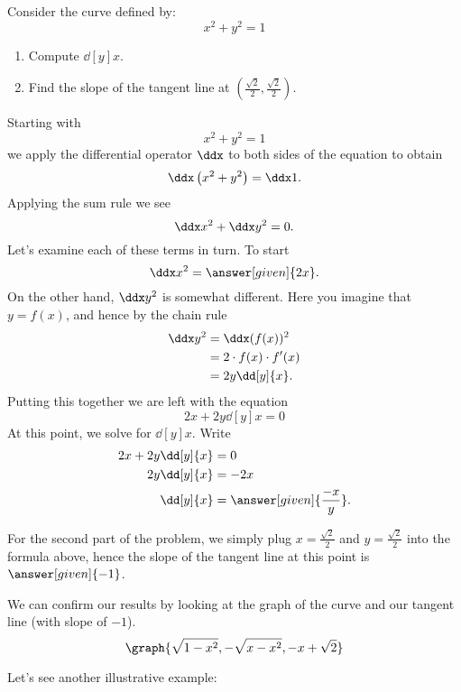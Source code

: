 \documentclass{ximera}
\begin{document}
\begin{example}
Consider the curve defined by:
\[
x^2 + y^2 = 1
\]
\begin{enumerate}
\item Compute $\dd[y]{x}$.
\item Find the slope of the tangent line at $\left(\frac{\sqrt{2}}{2},\frac{\sqrt{2}}{2}\right)$.
\end{enumerate}
\begin{explanation}
  Starting with 
\[
x^2 + y^2 = 1
\]
we apply the differential operator $\ddx$ to both sides of the
equation to obtain
\[
\ddx \left(x^2+y^2\right) = \ddx 1.
\]
Applying the sum rule we see
\[
\ddx x^2+\ddx y^2 = 0.
\]
Let's examine each of these terms in turn. To start
\[
\ddx x^2 = \answer[given]{2x}.
\]
On the other hand, $\ddx y^2$ is somewhat different. Here you imagine that $y = f(x)$, and hence by the chain rule
\begin{align*}
\ddx y^2 &= \ddx (f(x))^2 \\ 
&= 2\cdot f(x) \cdot f'(x) \\
&= 2y\dd[y]{x}.
\end{align*}
Putting this together we are left with the equation
\[
2x + 2y\dd[y]{x} =0
\]
At this point, we solve for $\dd[y]{x}$. Write
\begin{align*}
2x + 2y\dd[y]{x} &= 0\\
2y \dd[y]{x} &= -2x\\
\dd[y]{x} &= \answer[given]{\frac{-x}{y}}.
\end{align*}

For the second part of the problem, we simply plug $x=\frac{\sqrt{2}}{2}$ and $y=\frac{\sqrt{2}}{2}$
into the formula above, hence the slope of the tangent line at this point 
is $\answer[given]{-1}$.
\end{explanation}
\begin{prompt} We can confirm our results by looking at the graph of the curve and our tangent line (with slope of $-1$). 
\[
\graph{\sqrt{1-x^2}, -\sqrt{x-x^2}, -x+\sqrt{2}}
\]
\end{prompt}
\end{example}

Let's see another illustrative example:
\end{document}
